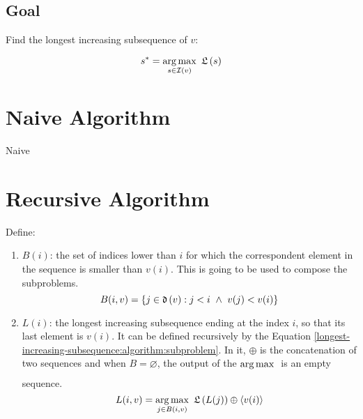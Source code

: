 \subsection{Goal}

Find the longest increasing subsequence of $v$:

\begin{equation}
    s^* = \operatorname*{arg\,max}\limits_{s \in \mathcal{I}\left(v\right)} \ \mathfrak{L}\left(s\right)
\end{equation}

\section{Naive Algorithm}

\begin{algorithm}[H]
    \caption{Naive}
    \label{longest-increasing-subsequence:algorithm:naive}
    \begin{algorithmic}[1]
    \end{algorithmic}
\end{algorithm}

\section{Recursive Algorithm}

Define:

\begin{enumerate}
    \item $B(i)$: the set of indices lower than $i$ for which the correspondent element in the sequence is smaller than $v(i)$. This is going to be used to compose the subproblems.
    \begin{equation}
        B(i, v) = \left\{  j \in \mathfrak{d}\left(v\right) : j < i \ \land\  v(j) < v(i) \right\}
    \end{equation}
    \item $L(i)$: the longest increasing subsequence ending at the index $i$, so that its last element is $v(i)$. It can be defined recursively by the Equation \ref{longest-increasing-subsequence:algorithm:subproblem}. In it, $\oplus$ is the concatenation of two sequences and when $B = \varnothing$, the output of the $\operatorname*{arg\,max}\limits_{} \ $ is an empty sequence.
    \begin{equation}
        \label{longest-increasing-subsequence:algorithm:subproblem}
        L(i, v) = \operatorname*{arg\,max}\limits_{j \in B(i, v)} \ \mathfrak{L}\left(L(j)\right) \oplus \left\langle v(i) \right\rangle
    \end{equation}
\end{enumerate}

